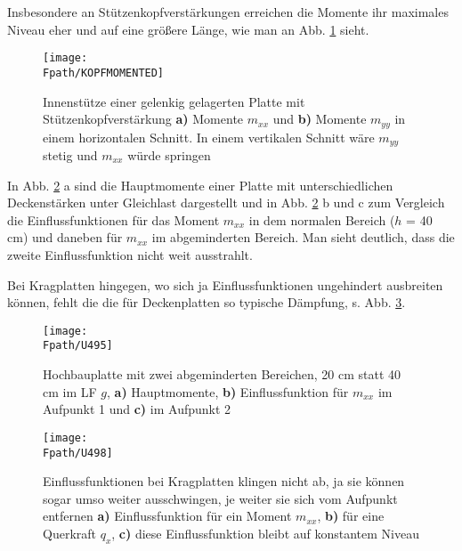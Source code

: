 Insbesondere an St\"{u}tzenkopfverst\"{a}rkungen erreichen die Momente ihr maximales Niveau eher und auf eine gr\"{o}{\ss}ere L\"{a}nge, wie man an Abb. \ref{Kopfmomente} sieht.
\begin{figure}[tbp]
\centering
\if {} \sidecaption \fi
\texttt{[image: \\Fpath/KOPFMOMENTED]}
\caption{Innenst\"{u}tze einer gelenkig gelagerten Platte mit St\"{u}tzenkopfverst\"{a}rkung {\bf
a)} Momente $m_{xx}$ und {\bf b)} Momente $m_{yy}$ in einem horizontalen Schnitt. In
einem vertikalen Schnitt w\"{a}re $m_{yy}$ stetig und $m_{xx}$ w\"{u}rde springen}
\label{Kopfmomente}
\end{figure}%

In Abb. \ref{UE324} a sind die Hauptmomente einer Platte mit unterschiedlichen Deckenst\"{a}rken unter Gleichlast dargestellt und in Abb. \ref{UE324} b und c zum Vergleich die Einflussfunktionen f\"{u}r das Moment $m_{xx}$ in dem normalen Bereich ($h$ = 40 cm) und daneben f\"{u}r $m_{xx}$ im abgeminderten Bereich. Man sieht deutlich, dass die zweite Einflussfunktion nicht weit ausstrahlt.

Bei Kragplatten hingegen, wo sich ja Einflussfunktionen ungehindert ausbreiten k\"{o}nnen, fehlt die die f\"{u}r Deckenplatten so typische D\"{a}mpfung, s. Abb. \ref{U498}.
\begin{figure}
\centering
{\texttt{[image: \\Fpath/U495]}}
  \caption{Hochbauplatte mit zwei abgeminderten Bereichen, 20 cm statt 40 cm im LF $g$, {\bf a)} Hauptmomente, {\bf b)} Einflussfunktion f\"{u}r $m_{xx}$ im Aufpunkt 1 und {\bf c)} im Aufpunkt 2 } \label{UE324}
\end{figure}

\begin{figure}[tbp]
\centering
\texttt{[image: \\Fpath/U498]}
\caption{Einflussfunktionen bei Kragplatten klingen nicht ab, ja sie k\"{o}nnen sogar umso weiter ausschwingen, je weiter sie sich vom Aufpunkt entfernen \textbf{ a)} Einflussfunktion f\"{u}r ein Moment $m_{xx}$, \textbf{ b)} f\"{u}r eine Querkraft $q_x$,  \textbf{ c)} diese Einflussfunktion bleibt auf konstantem Niveau}\label{U498}%
\end{figure}%


